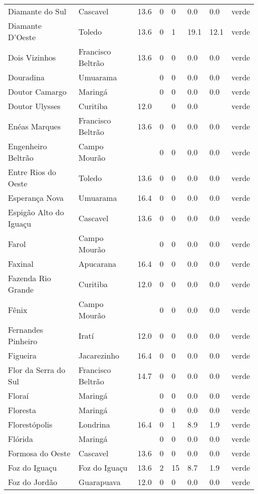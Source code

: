 \begin{longtable}{l|lllllll}
  Diamante do Sul & Cascavel & 13.6 & 0 & 0 & 0.0 & 0.0 & verde \\ 
  Diamante D'Oeste & Toledo & 13.6 & 0 & 1 & 19.1 & 12.1 & verde \\ 
  Dois Vizinhos & Francisco Beltrão & 13.6 & 0 & 0 & 0.0 & 0.0 & verde \\ 
  Douradina & Umuarama &  & 0 & 0 & 0.0 & 0.0 & verde \\ 
  Doutor Camargo & Maringá &  & 0 & 0 & 0.0 & 0.0 & verde \\ 
  Doutor Ulysses & Curitiba & 12.0 &  & 0 & 0.0 &  & verde \\ 
  Enéas Marques & Francisco Beltrão & 13.6 & 0 & 0 & 0.0 & 0.0 & verde \\ 
  Engenheiro Beltrão & Campo Mourão &  & 0 & 0 & 0.0 & 0.0 & verde \\ 
  Entre Rios do Oeste & Toledo & 13.6 & 0 & 0 & 0.0 & 0.0 & verde \\ 
  Esperança Nova & Umuarama & 16.4 & 0 & 0 & 0.0 & 0.0 & verde \\ 
  Espigão Alto do Iguaçu & Cascavel & 13.6 & 0 & 0 & 0.0 & 0.0 & verde \\ 
  Farol & Campo Mourão &  & 0 & 0 & 0.0 & 0.0 & verde \\ 
  Faxinal & Apucarana & 16.4 & 0 & 0 & 0.0 & 0.0 & verde \\ 
  Fazenda Rio Grande & Curitiba & 12.0 & 0 & 0 & 0.0 & 0.0 & verde \\ 
  Fênix & Campo Mourão &  & 0 & 0 & 0.0 & 0.0 & verde \\ 
  Fernandes Pinheiro & Iratí & 12.0 & 0 & 0 & 0.0 & 0.0 & verde \\ 
  Figueira & Jacarezinho & 16.4 & 0 & 0 & 0.0 & 0.0 & verde \\ 
  Flor da Serra do Sul & Francisco Beltrão & 14.7 & 0 & 0 & 0.0 & 0.0 & verde \\ 
  Floraí & Maringá &  & 0 & 0 & 0.0 & 0.0 & verde \\ 
  Floresta & Maringá &  & 0 & 0 & 0.0 & 0.0 & verde \\ 
  Florestópolis & Londrina & 16.4 & 0 & 1 & 8.9 & 1.9 & verde \\ 
  Flórida & Maringá &  & 0 & 0 & 0.0 & 0.0 & verde \\ 
  Formosa do Oeste & Cascavel & 13.6 & 0 & 0 & 0.0 & 0.0 & verde \\ 
  Foz do Iguaçu & Foz do Iguaçu & 13.6 & 2 & 15 & 8.7 & 1.9 & verde \\ 
  Foz do Jordão & Guarapuava & 12.0 & 0 & 0 & 0.0 & 0.0 & verde \\ 

\end{longtable}
